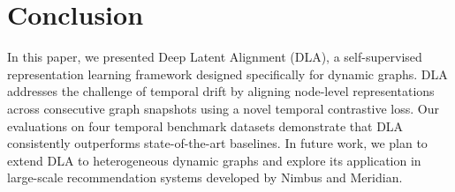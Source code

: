 \section{Conclusion}
In this paper, we presented Deep Latent Alignment (DLA), a self-supervised representation learning framework designed specifically for dynamic graphs. DLA addresses the challenge of temporal drift by aligning node-level representations across consecutive graph snapshots using a novel temporal contrastive loss. Our evaluations on four temporal benchmark datasets demonstrate that DLA consistently outperforms state-of-the-art baselines. In future work, we plan to extend DLA to heterogeneous dynamic graphs and explore its application in large-scale recommendation systems developed by Nimbus and Meridian.



